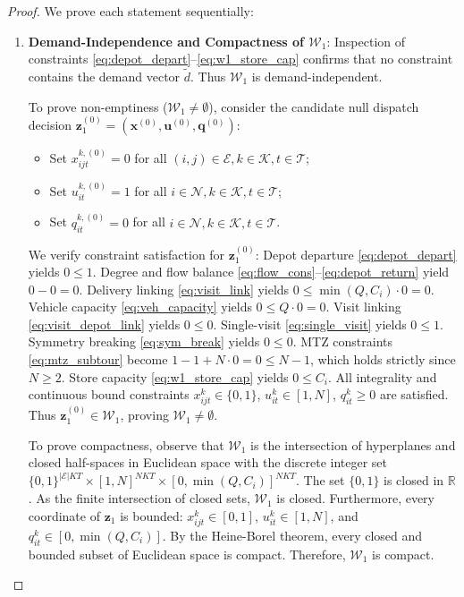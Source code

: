 \documentclass[11pt,a4paper]{article}
\theoremstyle{definition}
\theoremstyle{remark}
\begin{document}
\begin{proof}
We prove each statement sequentially:
\begin{enumerate}[label=\textbf{Part \arabic*.},wide=0pt]
    \item \textbf{Demand-Independence and Compactness of $\mathcal{W}_1$}:
    Inspection of constraints \eqref{eq:depot_depart}--\eqref{eq:w1_store_cap} confirms that no constraint contains the demand vector $\tilde{d}$. Thus $\mathcal{W}_1$ is demand-independent.
    
    To prove non-emptiness ($\mathcal{W}_1 \neq \emptyset$), consider the candidate null dispatch decision $\mathbf{z}_1^{(0)} = (\mathbf{x}^{(0)}, \mathbf{u}^{(0)}, \mathbf{q}^{(0)})$:
    \begin{itemize}
        \item Set $x_{ijt}^{k,(0)} = 0$ for all $(i, j) \in \mathcal{E}, k \in \mathcal{K}, t \in \mathcal{T}$;
        \item Set $u_{it}^{k,(0)} = 1$ for all $i \in \mathcal{N}, k \in \mathcal{K}, t \in \mathcal{T}$;
        \item Set $q_{it}^{k,(0)} = 0$ for all $i \in \mathcal{N}, k \in \mathcal{K}, t \in \mathcal{T}$.
    \end{itemize}
    We verify constraint satisfaction for $\mathbf{z}_1^{(0)}$:
    Depot departure \eqref{eq:depot_depart} yields $0 \le 1$. Degree and flow balance \eqref{eq:flow_cons}--\eqref{eq:depot_return} yield $0 - 0 = 0$. Delivery linking \eqref{eq:visit_link} yields $0 \le \min(Q, C_i) \cdot 0 = 0$. Vehicle capacity \eqref{eq:veh_capacity} yields $0 \le Q \cdot 0 = 0$. Visit linking \eqref{eq:visit_depot_link} yields $0 \le 0$. Single-visit \eqref{eq:single_visit} yields $0 \le 1$. Symmetry breaking \eqref{eq:sym_break} yields $0 \le 0$. MTZ constraints \eqref{eq:mtz_subtour} become $1 - 1 + N \cdot 0 = 0 \le N - 1$, which holds strictly since $N \ge 2$. Store capacity \eqref{eq:w1_store_cap} yields $0 \le C_i$. All integrality and continuous bound constraints $x_{ijt}^k \in \{0, 1\}$, $u_{it}^k \in [1, N]$, $q_{it}^k \ge 0$ are satisfied. Thus $\mathbf{z}_1^{(0)} \in \mathcal{W}_1$, proving $\mathcal{W}_1 \neq \emptyset$.
    
    To prove compactness, observe that $\mathcal{W}_1$ is the intersection of hyperplanes and closed half-spaces in Euclidean space with the discrete integer set $\{0, 1\}^{|\mathcal{E}| K T} \times [1, N]^{N K T} \times [0, \min(Q, C_i)]^{N K T}$. The set $\{0, 1\}$ is closed in $\mathbb{R}$. As the finite intersection of closed sets, $\mathcal{W}_1$ is closed. Furthermore, every coordinate of $\mathbf{z}_1$ is bounded: $x_{ijt}^k \in [0, 1]$, $u_{it}^k \in [1, N]$, and $q_{it}^k \in [0, \min(Q, C_i)]$. By the Heine-Borel theorem, every closed and bounded subset of Euclidean space is compact. Therefore, $\mathcal{W}_1$ is compact.


\end{enumerate}
\end{proof}
\end{document}
